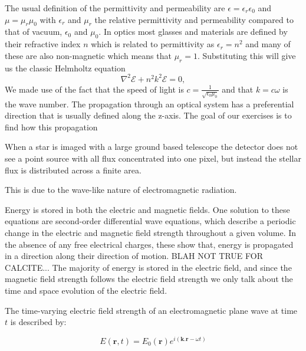 \documentclass[letterpaper]{ar-1col}
\begin{document}
The usual definition of the permittivity and permeability are $\epsilon=\epsilon_r \epsilon_0$ and $\mu=\mu_r \mu_0$ with $\epsilon_r$ and $\mu_r$ the relative permittivity and permeability compared to that of vacuum, $\epsilon_0$ and $\mu_0$. In optics most glasses and materials are defined by their refractive index $n$ which is related to permittivity as $\epsilon_r = n^2$ and many of these are also non-magnetic which means that $\mu_r=1$. Substituting this will give us the classic Helmholtz equation
\begin{equation}
\nabla^2\mathcal{E} + n^2k^2 \mathcal{E} = 0,
\end{equation}
We made use of the fact that the speed of light is $c = \frac{1}{\sqrt{\epsilon_0\mu_0}}$ and that $k = c\omega$ is the wave number. The propagation through an optical system has a preferential direction that is usually defined along the z-axis. The goal of our exercises is to find how this propagation 



When a star is imaged with a large ground based telescope the detector does not see a point source with all flux concentrated into one pixel, but instead the stellar flux is distributed across a finite area.%

%
This is due to the wave-like nature of electromagnetic radiation.


Energy is stored in both the electric and magnetic fields.
One solution to these equations are second-order differential wave equations, which describe a periodic change in the electric and magnetic field strength throughout a given volume.
%
In the absence of any free electrical charges, these show that, energy is propagated in a direction along their direction of motion. BLAH NOT TRUE FOR CALCITE...
The majority of energy is stored in the electric field, and since the magnetic field strength follows the electric field strength we only talk about the time and space evolution of the electric field.

The time-varying electric field strength of an electromagnetic plane wave at time $t$ is described by:

$$E(\mathbf{r},t)=E_0(\mathbf{r})e^{i(\mathbf{k}.\mathbf{r}-\omega t)}$$
\end{document}
